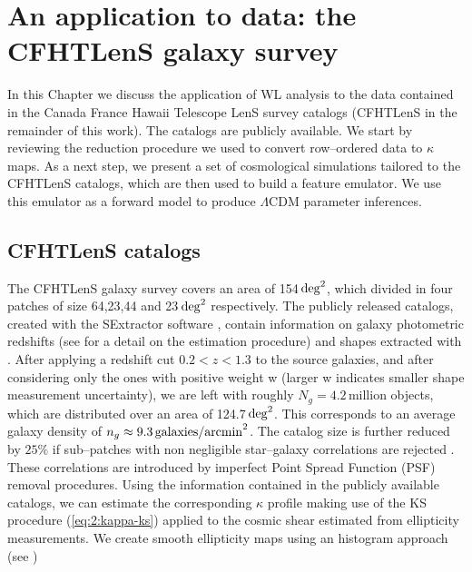 
\chapter{An application to data: the CFHTLenS galaxy survey}
 \thispagestyle{plain}
\setlength{\parindent}{10mm}

\label{chp:6}

In this Chapter we discuss the application of WL analysis to the data contained in the Canada France Hawaii Telescope LenS survey catalogs \citep{cfht1,cfht2,CFHTKilbinger} (CFHTLenS in the remainder of this work). The catalogs are publicly available. We start by reviewing the reduction procedure we used to convert row--ordered data to $\kappa$ maps. As a next step, we present a set of cosmological simulations tailored to the CFHTLenS catalogs, which are then used to build a feature emulator. We use this emulator as a forward model to produce $\Lambda$CDM parameter inferences.   

\section{CFHTLenS catalogs}
The CFHTLenS galaxy survey covers an area of 154\,${\rm deg}^2$, which divided in four patches of size 64,23,44 and 23\,${\rm deg}^2$ respectively. The publicly released catalogs, created with the SExtractor software \citep{SExtractor}, contain information on galaxy photometric redshifts (see \citep{cfhtPhoto} for a detail on the estimation procedure) and shapes extracted with  \citep{cfht1,cfht2}. After applying a redshift cut $0.2<z<1.3$ to the source galaxies, and after considering only the ones with positive weight w (larger w indicates smaller shape measurement uncertainty), we are left with roughly $N_g=4.2$\,million objects, which are distributed over an area of 124.7\,${\rm deg}^2$. This corresponds to an average galaxy density of $n_g\approx 9.3\,{\rm galaxies/arcmin}^2$. The catalog size is further reduced by $25\%$ if sub--patches with non negligible star--galaxy correlations are rejected \citep{CFHTFu}. These correlations are introduced by imperfect Point Spread Function (PSF) removal procedures. Using the information contained in the publicly available catalogs, we can estimate the corresponding $\kappa$ profile making use of the KS procedure (\ref{eq:2:kappa-ks}) applied to the cosmic shear estimated from ellipticity measurements. We create smooth ellipticity maps using an histogram approach (see \citep{PetriCFHTMink,PetriCFHTPeaks})

